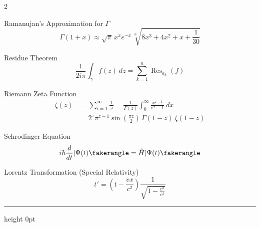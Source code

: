 \documentclass[12pt]{article}
\DeclareMathOperator{\Res}{Res}
\begin{document}
\begin{multicols*}{2}
\vfill

Ramanujan's Approximation for $\Gamma$
\[
\Gamma(1+x)\approx\sqrt\pi\,x^xe^{-x}\,\sqrt[6]{8x^3+4x^2+x+\frac1{30}}
\]

\vfill

Residue Theorem
\[
\frac1{2i\pi}\int_{\gamma}f(z)\ dz=\sum_{k=1}^n\Res_{a_k}(f)
\]

\vfill

Riemann Zeta Function
\begin{align*}
\zeta(z)&=\sum_{i=1}^\infty\frac1{z^i}
  =\frac1{\Gamma(z)}\int_0^\infty\frac{x^{z-1}}{e^x-1}\ dx\\
  &=2^z\pi^{z-1}\sin\left(\frac{\pi z}2\right)\,\Gamma(1-z)\,\zeta(1-z)
\end{align*}

\vfill

Schrodinger Equation
\[
i\hbar\frac d{dt}|\Psi(t)\fakerangle=\hat H|\Psi(t)\fakerangle
\]

\vfill

Lorentz Transformation (Special Relativity)
\belowdisplayskip=0pt\relax
\belowdisplayshortskip=0pt\relax
\[
t'=\left(t-\frac{vx}{c^2}\right)\frac1{\sqrt{1-\frac{v^2}{c^2}}}
\]
\hrule height 0pt

\end{multicols*}
\end{document}
